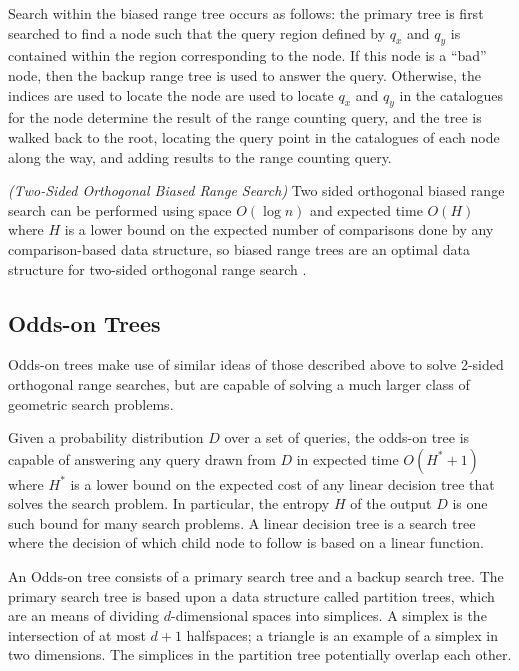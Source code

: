 \documentclass[mcs]{scsthesis}
\begin{document}
Search within the biased range tree occurs as follows: the primary tree is
first searched to find a node such that the query region defined by \(q_x\) and
\(q_y\) is contained within the region corresponding to the node. If this node
is a ``bad'' node, then the backup range tree is used to answer the query.
Otherwise, the indices are used to locate the node are used to locate \(q_x\)
and \(q_y\) in the catalogues for the node determine the result of the range
counting query, and the tree is walked back to the root, locating the query
point in the catalogues of each node along the way, and adding results to
the range counting query.

\begin{thm} \emph{(Two-Sided Orthogonal Biased Range Search)} 
Two sided orthogonal biased range search can be performed using space
\(O(\log n)\) and expected time \(O(H)\) where \(H\) is a lower bound on the
expected number of comparisons done by any comparison-based data structure, so
biased range trees are an optimal data structure for two-sided orthogonal
range search \cite{biasedrange}.
\end{thm}

\subsection{Odds-on Trees}

Odds-on trees make use of similar ideas of those described above to solve
2-sided orthogonal range searches, but are capable of solving a much larger
class of geometric search problems.

Given a probability distribution \(D\) over a set of queries, the odds-on tree
is capable of answering any query drawn from \(D\) in expected time
\(O(H^* + 1)\) where \(H^*\) is a lower bound on the expected cost of any
linear decision tree that solves the search problem. In particular, the
entropy \(H\) of the output \(D\) is one such bound for many search
problems. A linear decision tree is a search tree where the decision of which
child node to follow is based on a linear function.

An Odds-on tree consists of a primary search tree and a backup search tree.
The primary search tree is based upon a data structure called partition trees,
which are an means of dividing \(d\)-dimensional spaces into simplices. A
simplex is the intersection of at most \(d + 1\) halfspaces; a triangle is an
example of a simplex in two dimensions. The simplices in the partition tree
potentially overlap each other.
\end{document}
